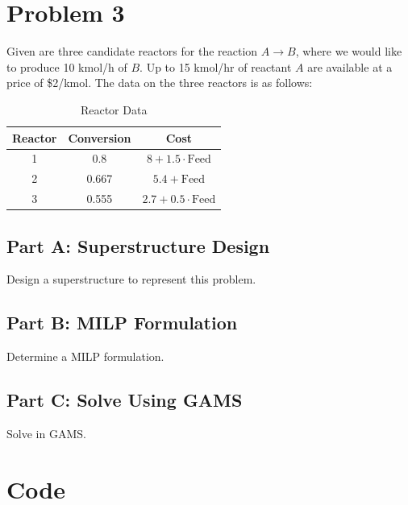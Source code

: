 \documentclass[11pt]{article}
\begin{document}
\section{Problem 3}
\label{prob3}

Given are three candidate reactors for the reaction \( A \rightarrow B \), where we would like to produce 10 kmol/h of \( B \). Up to 15 kmol/hr of reactant \( A \) are available at a price of \$2/kmol. The data on the three reactors is as follows:

\begin{table}[htbp]
\centering
\begin{tabular}{|c|c|c|}
\hline
\textbf{Reactor} & \textbf{Conversion} & \textbf{Cost} \\ \hline
1 & 0.8 & \( 8 + 1.5 \cdot \text{Feed} \) \\ \hline
2 & 0.667 & \( 5.4 + \text{Feed} \) \\ \hline
3 & 0.555 & \( 2.7 + 0.5 \cdot \text{Feed} \) \\ \hline
\end{tabular}
\caption{Reactor Data}
\label{tab:reactor_data}
\end{table}

\subsection{Part A: Superstructure Design}
Design a superstructure to represent this problem.

\subsection{Part B: MILP Formulation}
Determine a MILP formulation.

\subsection{Part C: Solve Using GAMS}
Solve in GAMS.



\section{Code}
\end{document}
